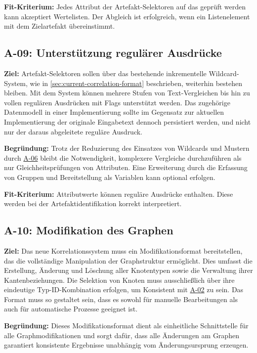 \textbf{Fit-Kriterium:}
Jedes Attribut der Artefakt-Selektoren auf das geprüft werden kann akzeptiert Wertelisten.
Der Abgleich ist erfolgreich, wenn ein Listenelement mit dem Zielartefakt übereinstimmt.

\subsection{A-09: Unterstützung regulärer Ausdrücke}\label{subsec:req-regex-support}

\textbf{Ziel:}
Artefakt-Selektoren sollen über das bestehende inkrementelle Wildcard-System, wie in \autoref{sec:current-correlation-format} beschrieben, weiterhin bestehen bleiben.
Mit dem System können mehrere Stufen von Text-Vergleichen bis hin zu vollen regulären Ausdrücken mit Flags unterstützt werden.
Das zugehörige Datenmodell in einer Implementierung sollte im Gegensatz zur aktuellen Implementierung der originale Eingabetext dennoch persistiert werden, und nicht nur der daraus abgeleitete reguläre Ausdruck.

\textbf{Begründung:}
Trotz der Reduzierung des Einsatzes von Wildcards und Mustern durch \hyperref[subsec:req-type-specific-matching]{A-06} bleibt die Notwendigkeit, komplexere Vergleiche durchzuführen als nur Gleichheitsprüfungen von Attributen.
Eine Erweiterung durch die Erfassung von Gruppen und Bereitstellung als Variablen kann optional erfolgen.

\textbf{Fit-Kriterium:}
Attributwerte können reguläre Ausdrücke enthalten.
Diese werden bei der Artefaktidentifikation korrekt interpretiert.

\subsection{A-10: Modifikation des Graphen}\label{subsec:req-manual-format-modification}

\textbf{Ziel:}
Das neue Korrelationssystem muss ein Modifikationsformat bereitstellen, das die vollständige Manipulation der Graphstruktur ermöglicht.
Dies umfasst die Erstellung, Änderung und Löschung aller Knotentypen sowie die Verwaltung ihrer Kantenbeziehungen.
Die Selektion von Knoten muss ausschließlich über ihre eindeutige Typ-ID-Kombination erfolgen, um Konsistent mit \hyperref[subsec:req-node-id-type]{A-02} zu sein.
Das Format muss so gestaltet sein, dass es sowohl für manuelle Bearbeitungen als auch für automatische Prozesse geeignet ist.

\textbf{Begründung:}
Dieses Modifikationsformat dient als einheitliche Schnittstelle für alle Graphmodifikationen und sorgt dafür, dass alle Änderungen am Graphen garantiert konsistente Ergebnisse unabhängig vom Änderungsursprung erzeugen.

